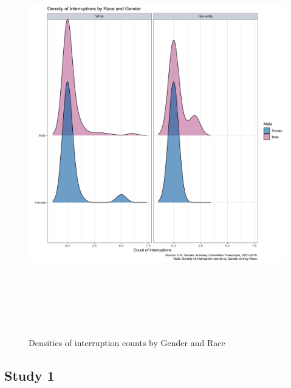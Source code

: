 \documentclass [12pt]{article}
\begin{document}
    \begin{figure}[H]
        \centering
        \includegraphics[height = 175mm, width = 175mm]{../tables_figures/interruptions_ridgeplot.png}
        \caption{Densities of interruption counts by Gender and Race}
        \label{fig:2}
    \end{figure}
    

    
\subsection{Study 1}
	    
\end{document}
